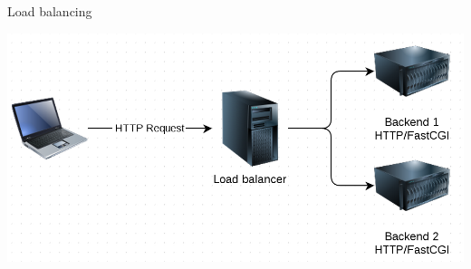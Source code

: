 \begin{frame}{Load balancing}
  \begin{center}
    \includegraphics[width=\textwidth,keepaspectratio]{sources/images/lb.png}
  \end{center}
\end{frame}
